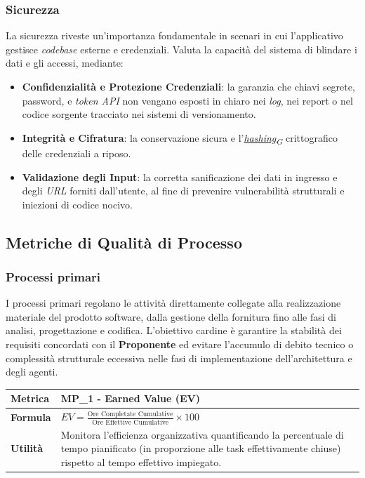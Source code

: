\documentclass[12pt, a4paper]{article}
\newcommand{\urlglossario}{https://skynetunigroup.github.io/Code_Guardian/Documentazione/PB/glossario_v2.0.0.pdf} %
\newcommand{\glo}[2]{\href{\urlglossario\#nameddest=#2}{#1\textsubscript{G}}}
\begin{document}
\subsubsection{Sicurezza}
La sicurezza riveste un'importanza fondamentale in scenari in cui l'applicativo gestisce \textit{codebase} esterne e credenziali. Valuta la capacità del sistema di blindare i dati e gli accessi, mediante:
\begin{itemize}
    \item \textbf{Confidenzialità e Protezione Credenziali}: la garanzia che chiavi segrete, password, e \textit{token API} non vengano esposti in chiaro nei \textit{log}, nei report o nel codice sorgente tracciato nei sistemi di versionamento.
    \item \textbf{Integrità e Cifratura}: la conservazione sicura e l'\textit{\glo{hashing}{hash}} crittografico delle credenziali a riposo.
    \item \textbf{Validazione degli Input}: la corretta sanificazione dei dati in ingresso e degli \textit{URL} forniti dall'utente, al fine di prevenire vulnerabilità strutturali e iniezioni di codice nocivo.
\end{itemize}

\subsection{Metriche di Qualità di Processo}

\subsubsection{Processi primari}
I processi primari regolano le attività direttamente collegate alla realizzazione materiale del prodotto software, dalla gestione della fornitura fino alle fasi di analisi, progettazione e codifica. L'obiettivo cardine è garantire la stabilità dei requisiti concordati con il \textbf{Proponente} ed evitare l'accumulo di debito tecnico o complessità strutturale eccessiva nelle fasi di implementazione dell'architettura e degli agenti.


\begin{table}[H]
\centering
\renewcommand{\arraystretch}{1.5}
\begin{tabular}{|l|p{12cm}|}
\hline
\textbf{Metrica} & MP\_1 - Earned Value (EV) \\ \hline
\textbf{Formula} & \( EV = \frac{\text{Ore Completate Cumulative}}{\text{Ore Effettive Cumulative}} \times 100 \) \\ \hline
\textbf{Utilità} & Monitora l'efficienza organizzativa quantificando la percentuale di tempo pianificato (in proporzione alle task effettivamente chiuse) rispetto al tempo effettivo impiegato. \\ \hline
\end{tabular}
\end{table}
\end{document}
